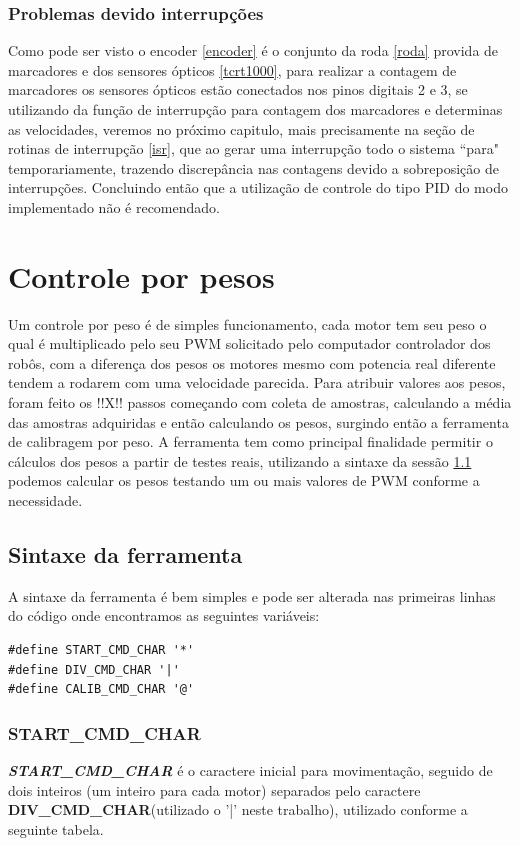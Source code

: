 \documentclass[a4paper,12pt,portuguese]{ufms-cpcx}
\begin{document}
\subsection{Problemas devido interrupções}
Como pode ser visto o encoder \ref{encoder} é o conjunto da roda \ref{roda} provida de marcadores e  dos sensores ópticos \ref{tcrt1000}, para realizar a contagem de marcadores os sensores ópticos estão conectados nos pinos digitais 2 e 3, se utilizando da função de interrupção para contagem dos marcadores e determinas as velocidades, veremos no próximo capitulo, mais precisamente na seção de rotinas de interrupção \ref{isr}, que ao gerar uma interrupção todo o sistema ``para" temporariamente, trazendo discrepância nas contagens devido a sobreposição de interrupções.
Concluindo então que a utilização de controle do tipo PID do modo implementado não é recomendado.

\chapter{Controle por pesos}
Um controle por peso é de simples funcionamento, cada motor tem seu peso o qual é multiplicado pelo seu PWM solicitado pelo computador controlador dos robôs, com a diferença dos pesos os motores mesmo com potencia real diferente tendem a rodarem com uma velocidade parecida. Para atribuir valores aos pesos, foram feito os !!X!! passos começando com coleta de amostras, calculando a média das amostras adquiridas e então calculando os pesos, surgindo então a ferramenta de calibragem por peso.
A ferramenta tem como principal finalidade permitir o cálculos dos pesos a partir de testes reais, utilizando a sintaxe da sessão \ref{sintaxe} podemos calcular os pesos testando um ou mais valores de PWM conforme a necessidade.
 
\section{Sintaxe da ferramenta}\label{sintaxe}
A sintaxe da ferramenta é bem simples e pode ser alterada nas primeiras linhas do código onde encontramos as seguintes variáveis:
\begin{lstlisting}
#define START_CMD_CHAR '*'
#define DIV_CMD_CHAR '|'
#define CALIB_CMD_CHAR '@'
\end{lstlisting}

\subsection{\textbf{START\_CMD\_CHAR}}\label{stardcmd}
\textbf{\textit{START\_CMD\_CHAR}} é o caractere inicial para movimentação, seguido de dois inteiros (um inteiro para cada motor) separados pelo caractere \textbf{DIV\_CMD\_CHAR}(utilizado o '|' neste trabalho), utilizado conforme a seguinte tabela.
\end{document}
